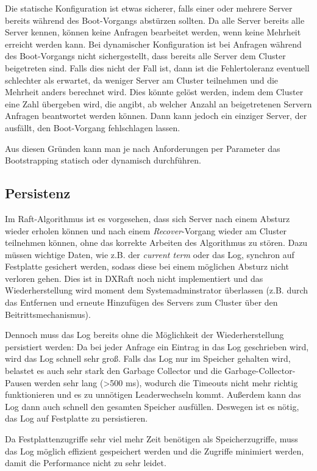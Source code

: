 Die statische Konfiguration ist etwas sicherer, falls einer oder mehrere  Server bereits während des Boot-Vorgangs abstürzen sollten. Da alle Server bereits alle Server kennen, können keine Anfragen bearbeitet werden, wenn keine Mehrheit erreicht werden kann. Bei dynamischer Konfiguration ist bei Anfragen während des Boot-Vorgangs nicht sichergestellt, dass bereits alle Server dem Cluster beigetreten sind. Falls dies nicht der Fall ist, dann ist die Fehlertoleranz eventuell schlechter als erwartet, da weniger Server am Cluster teilnehmen und die Mehrheit anders berechnet wird. Dies könnte gelöst werden, indem dem Cluster eine Zahl übergeben wird, die angibt, ab welcher Anzahl an beigetretenen Servern Anfragen beantwortet werden können. Dann kann jedoch ein einziger Server, der ausfällt, den Boot-Vorgang fehlschlagen lassen.

Aus diesen Gründen kann man je nach Anforderungen per Parameter das Bootstrapping statisch oder dynamisch durchführen.

\subsection{Persistenz}

Im Raft-Algorithmus ist es vorgesehen, dass sich Server nach einem Absturz wieder erholen können und nach einem \textit{Recover}-Vorgang wieder am Cluster teilnehmen können, ohne das korrekte Arbeiten des Algorithmus zu stören. Dazu müssen wichtige Daten, wie z.B. der \textit{current term} oder das Log, synchron auf Festplatte gesichert werden, sodass diese bei einem möglichen Absturz nicht verloren gehen. Dies ist in DXRaft noch nicht implementiert und das Wiederherstellung wird moment dem Systemadminstrator überlassen (z.B. durch das Entfernen und erneute Hinzufügen des Servers zum Cluster über den Beitrittsmechanismus).

Dennoch muss das Log bereits ohne die Möglichkeit der Wiederherstellung persistiert werden: Da bei jeder Anfrage ein Eintrag in das Log geschrieben wird, wird das Log schnell sehr groß. Falls das Log nur im Speicher gehalten wird, belastet es auch sehr stark den Garbage Collector und die Garbage-Collector-Pausen werden sehr lang (\textgreater 500 ms), wodurch die Timeouts nicht mehr richtig funktionieren und es zu unnötigen Leaderwechseln kommt. Außerdem kann das Log dann auch schnell den gesamten Speicher ausfüllen. Deswegen ist es nötig, das Log auf Festplatte zu persistieren.

Da Festplattenzugriffe sehr viel mehr Zeit benötigen als Speicherzugriffe, muss das Log möglich effizient gespeichert werden und die Zugriffe minimiert werden, damit die Performance nicht zu sehr leidet.

